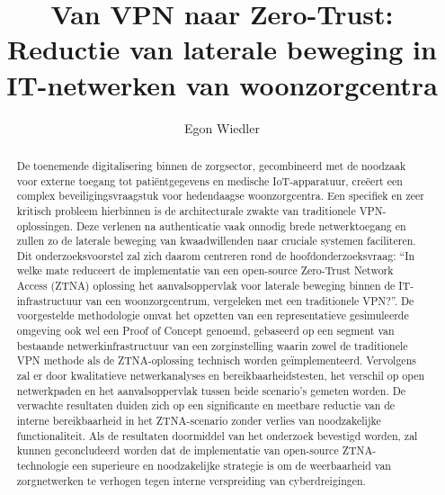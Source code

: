 \documentclass{hogent-article}
\title{Van VPN naar Zero-Trust: Reductie van laterale beweging in IT-netwerken van woonzorgcentra}
\author{Egon Wiedler}
\begin{document}
	
	\begin{abstract}
		
		De toenemende digitalisering binnen de zorgsector, gecombineerd met de noodzaak voor externe toegang tot patiëntgegevens en medische IoT-apparatuur, creëert een complex beveiligingsvraagstuk voor hedendaagse woonzorgcentra. Een specifiek en zeer kritisch probleem hierbinnen is de architecturale zwakte van traditionele VPN-oplossingen. Deze verlenen na authenticatie vaak onnodig brede netwerktoegang en zullen zo de laterale beweging van kwaadwillenden naar cruciale systemen faciliteren. 
		\newline Dit onderzoeksvoorstel zal zich daarom centreren rond de hoofdonderzoeksvraag: “In welke mate reduceert de implementatie van een open-source Zero-Trust Network Access (ZTNA) oplossing het aanvalsoppervlak voor laterale beweging binnen de IT-infrastructuur van een woonzorgcentrum, vergeleken met een traditionele VPN?”. De voorgestelde methodologie omvat het opzetten van een representatieve gesimuleerde omgeving ook wel een Proof of Concept genoemd, gebaseerd op een segment van bestaande netwerkinfrastructuur van een zorginstelling waarin zowel de traditionele VPN methode als de ZTNA-oplossing technisch worden geïmplementeerd.
		\newline Vervolgens zal er door kwalitatieve netwerkanalyses en bereikbaarheidstesten, het verschil op open netwerkpaden en het aanvalsoppervlak tussen beide scenario’s gemeten worden. De verwachte resultaten duiden zich op een significante en meetbare reductie van de interne bereikbaarheid in het ZTNA-scenario zonder verlies van noodzakelijke functionaliteit. Als de resultaten doormiddel van het onderzoek bevestigd worden, zal kunnen geconcludeerd worden dat de implementatie van open-source ZTNA-technologie een superieure en noodzakelijke strategie is om de weerbaarheid van zorgnetwerken te verhogen tegen interne verspreiding van cyberdreigingen.
		
		
	\end{abstract}
	
	\tableofcontents
	
	
	
	\printbibliography[heading=bibintoc]
	
\end{document}
